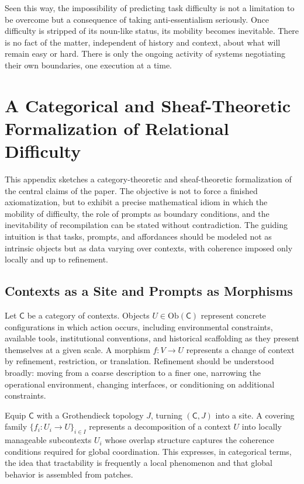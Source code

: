 \documentclass[12pt]{article}
\begin{document}
Seen this way, the impossibility of predicting task difficulty is not a limitation to be overcome but a consequence of taking anti-essentialism seriously. Once difficulty is stripped of its noun-like status, its mobility becomes inevitable. There is no fact of the matter, independent of history and context, about what will remain easy or hard. There is only the ongoing activity of systems negotiating their own boundaries, one execution at a time.

\section{A Categorical and Sheaf-Theoretic Formalization of Relational Difficulty}

This appendix sketches a category-theoretic and sheaf-theoretic formalization of the central claims of the paper. The objective is not to force a finished axiomatization, but to exhibit a precise mathematical idiom in which the mobility of difficulty, the role of prompts as boundary conditions, and the inevitability of recompilation can be stated without contradiction. The guiding intuition is that tasks, prompts, and affordances should be modeled not as intrinsic objects but as data varying over contexts, with coherence imposed only locally and up to refinement.

\subsection{Contexts as a Site and Prompts as Morphisms}

Let $\mathsf{C}$ be a category of contexts. Objects $U \in \mathrm{Ob}(\mathsf{C})$ represent concrete configurations in which action occurs, including environmental constraints, available tools, institutional conventions, and historical scaffolding as they present themselves at a given scale. A morphism $f: V \to U$ represents a change of context by refinement, restriction, or translation. Refinement should be understood broadly: moving from a coarse description to a finer one, narrowing the operational environment, changing interfaces, or conditioning on additional constraints.

Equip $\mathsf{C}$ with a Grothendieck topology $J$, turning $(\mathsf{C},J)$ into a site. A covering family $\{f_i: U_i \to U\}_{i \in I}$ represents a decomposition of a context $U$ into locally manageable subcontexts $U_i$ whose overlap structure captures the coherence conditions required for global coordination. This expresses, in categorical terms, the idea that tractability is frequently a local phenomenon and that global behavior is assembled from patches.
\end{document}
